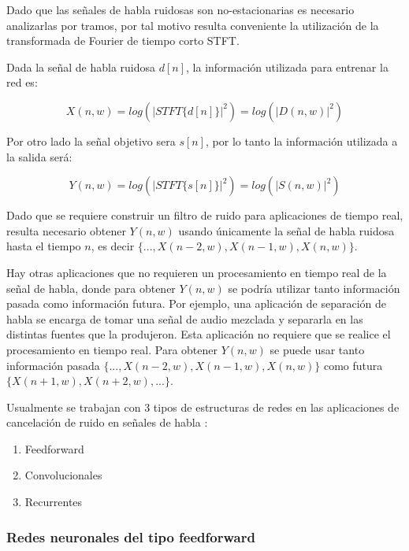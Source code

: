 Dado que las señales de habla ruidosas son no-estacionarias es necesario analizarlas por tramos, por tal motivo resulta conveniente la utilización de la transformada de Fourier de tiempo corto STFT. 

Dada la señal de habla ruidosa $d[n]$, la información utilizada para entrenar la red es:

\begin{equation*}
	X(n, w) = log(|STFT\{d[n]\}|^2) = log(|D(n, w)|^2)
\end{equation*}

Por otro lado la señal objetivo sera $s[n]$, por lo tanto la información utilizada a la salida será:

\begin{equation*}
	Y(n, w) = log(|STFT\{s[n]\}|^2) = log(|S(n, w)|^2)
\end{equation*}

Dado que se requiere construir un filtro de ruido para aplicaciones de tiempo real, resulta necesario obtener $Y(n, w)$ usando únicamente la señal de habla ruidosa hasta el tiempo $n$, es decir $\{..., X(n - 2, w), X(n - 1, w), X(n, w)\}$. 

Hay otras aplicaciones que no requieren un procesamiento en tiempo real de la señal de habla, donde para obtener $Y(n, w)$ se podría utilizar tanto información pasada como información futura. Por ejemplo, una aplicación de separación de habla se encarga de tomar una señal de audio mezclada y separarla en las distintas fuentes que la produjeron. Esta aplicación no requiere que se realice el procesamiento en tiempo real. Para obtener $Y(n, w)$ se puede usar tanto información pasada $\{..., X(n - 2, w), X(n - 1, w), X(n, w)\}$ como futura $\{X(n +1, w), X(n + 2, w), ...\}$. 

Usualmente se trabajan con 3 tipos de estructuras de redes en las aplicaciones de cancelación de ruido en señales de habla \cite{a_regression_approach_to_speech_enhancement_based_on_deep_neural_networks,a_fully_convolutional_neural_network_for_speech_enhancement,a_convolutional_recurrent_neural_network_for_real_time_speech_enhancement}:

\begin{enumerate}
	\item Feedforward
	\item Convolucionales
	\item Recurrentes
\end{enumerate}

\subsubsection{Redes neuronales del tipo feedforward}

